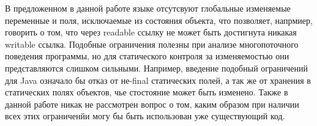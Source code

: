 В предложенном в данной работе языке отсутсвуют глобальные изменяемые переменные и поля, исключаемые из состояния объекта, что позволяет, напрмиер, говорить о том, что через readable ссылку не может быть достигнута никакая writable ссылка. Подобные ограничения полезны при анализе многопоточного поведения программы, но для статического контроля за изменяемостью они представляются слишком сильными. Например, введение подобный ограничений для Java означало бы отказ от не-final статических полей, а так же от хранения в статических полях объектов, чье стостояние может быть изменено. Также в данной работе никак не рассмотрен вопрос о том, каким образом при наличии всех этих ограниченйи могу бы быть использован уже существующий код.




























